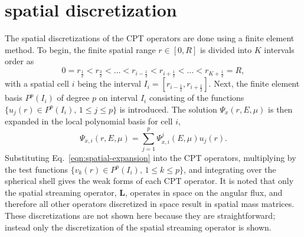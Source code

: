 \section{\dG spatial discretization}
The spatial discretizations of the CPT operators are done using a \dG finite element method. To begin, the finite spatial range $r \in [0,R]$ is divided into $K$ intervals order as
\begin{equation}
    0 = r_{\frac{1}{2}} < r_{\frac{3}{2}} < \ldots < r_{i-\frac{1}{2}} < r_{i+\frac{1}{2}} < \ldots < r_{K+\frac{1}{2}} = R,
\end{equation}
with a spatial cell $i$ being the interval $I_i = [r_{i-\frac{1}{2}}, r_{i+\frac{1}{2}}]$. Next, the finite element basis $P^p(I_i)$ of degree $p$ on interval $I_i$ consisting of the functions $\lbrace u_j(r) \in P^p(I_i), \, 1 \leq j \leq p \rbrace$ is introduced. The solution $\Psi_x(r,E,\mu)$ is then expanded in the local polynomial basis for cell $i$,
\begin{equation} \label{eqn:spatial-expansion}
    \Psi_{x,i}(r,E,\mu) = \sum_{j=1}^p \Psi_{x,i}^j(E,\mu) u_j(r).
\end{equation}
Substituting Eq.~\eqref{eqn:spatial-expansion} into the CPT operators, multiplying by the test functions $\lbrace v_k(r) \in P^p(I_i), \, 1 \leq k \leq p \rbrace$, and integrating over the spherical shell gives the weak forms of each CPT operator. It is noted that only the spatial streaming operator, $\boldsymbol{L}$, operates in space on the angular flux, and therefore all other operators discretized in space result in spatial mass matrices. These discretizations are not shown here because they are straightforward; instead only the discretization of the spatial streaming operator is shown.

